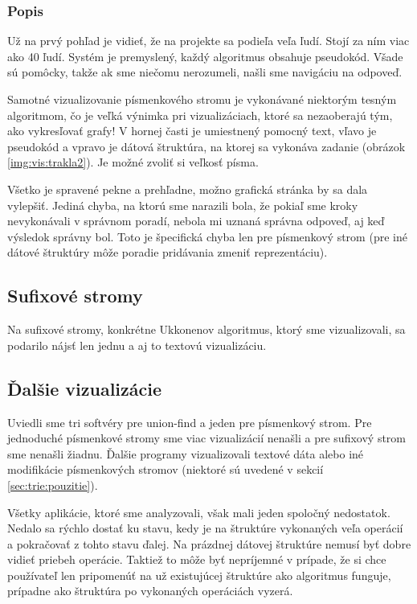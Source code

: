 \subsubsection{Popis}

Už na prvý pohľad je vidieť, že na projekte sa podieľa veľa ľudí. Stojí za ním 
viac ako 40 ľudí. Systém je premyslený, každý algoritmus obsahuje pseudokód. 
Všade sú pomôcky, takže ak sme niečomu nerozumeli, našli sme navigáciu na 
odpoveď. 

Samotné vizualizovanie písmenkového stromu je vykonávané niektorým tesným 
algoritmom, čo je veľká výnimka pri vizualizáciach, ktoré sa nezaoberajú tým, 
ako vykresľovať grafy! V hornej časti je umiestnený pomocný text, vľavo je 
pseudokód a vpravo je dátová štruktúra, na ktorej sa vykonáva zadanie (obrázok 
\ref{img:vis:trakla2}). Je možné zvoliť si veľkosť písma.

Všetko je spravené pekne a prehľadne, možno grafická stránka by sa dala 
vylepšiť. Jediná chyba, na ktorú sme narazili bola, že pokiaľ sme kroky 
nevykonávali v správnom poradí, nebola mi uznaná správna odpoveď, aj keď 
výsledok správny bol. Toto je špecifická chyba len pre písmenkový strom 
(pre iné dátové štruktúry môže poradie pridávania zmeniť reprezentáciu).

\subsection{Sufixové stromy}

Na sufixové stromy, konkrétne Ukkonenov algoritmus, ktorý sme vizualizovali, 
sa podarilo nájsť len jednu a aj to textovú vizualizáciu. 

\subsection{Ďalšie vizualizácie}

Uviedli sme tri softvéry pre union-find a jeden pre písmenkový 
strom. Pre jednoduché 
písmenkové stromy sme viac vizualizácií nenašli a pre sufixový strom sme 
nenašli žiadnu. Ďalšie programy vizualizovali 
textové dáta alebo iné modifikácie písmenkových stromov (niektoré sú uvedené v 
sekcií \ref{sec:trie:pouzitie}).

Všetky aplikácie, ktoré sme analyzovali, však mali jeden spoločný nedostatok. 
Nedalo sa rýchlo dostať ku stavu, kedy je na štruktúre vykonaných veľa operácií 
a pokračovať z tohto stavu ďalej. Na prázdnej dátovej štruktúre nemusí byť 
dobre vidieť priebeh operácie. Taktiež to môže byť nepríjemné v prípade, že si 
chce používateľ len pripomenúť na už existujúcej štruktúre ako algoritmus 
funguje, prípadne ako štruktúra po vykonaných operáciách vyzerá.

